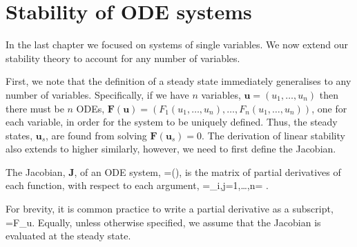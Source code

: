 \chapter{Stability of ODE systems}\label{Stability of ODE systems}
In the last chapter we focused on systems of single variables. We now extend our stability theory to account for any number of variables.

First, we note that the definition of a steady state immediately generalises to any number of variables. Specifically, if we have $n$ variables, $\bm{u}=(u_1,\dots,u_n)$ then there must be $n$ ODEs, $\bm{F}(\bm{u})=(F_1(u_1,\dots,u_n),\dots,F_n(u_1,\dots,u_n))$, one for each variable, in order for the system to be uniquely defined. Thus, the steady states, $\bm{u}_s$, are found from solving $\bm{F}(\bm{u}_s)=0$. The derivation of linear stability also extends to higher similarly, however, we need to first define the Jacobian.
\begin{defin}
The Jacobian, $\bm{J}$, of an ODE system,
\bb
{}=(),
\ee
is the matrix of partial derivatives of each function, with respect to each argument,
\bb
{}=\left[ \D{F_i}{u_j}\right]_{i,j=1,\dots,n}= . 
\ee
\end{defin}
For brevity, it is common practice to write a partial derivative as a subscript, \ie
\bb
{}=F_u.
\ee
Equally, unless otherwise specified, we assume that the Jacobian is evaluated at the steady state.

